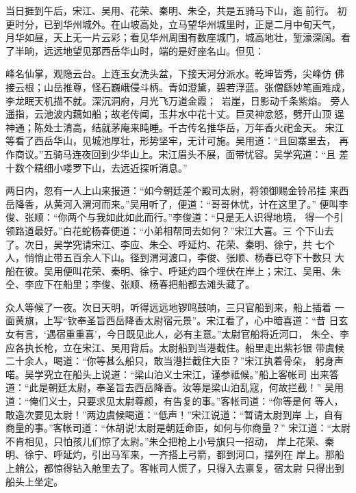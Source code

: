 当日捱到午后，宋江、吴用、花荣、秦明、朱仝，共是五骑马下山，迤前行。
初更时分，已到华州城外。在山坡高处，立马望华州城里时，正是二月中旬天气，
月华如昼，天上无一片云彩；看见华州周围有数座城门，城高地壮，堑濠深阔。看
了半晌，远远地望见那西岳华山时，端的是好座名山。但见：

峰名仙掌，观隐云台。上连玉女洗头盆，下接天河分派水。乾坤皆秀，尖峰仿
佛接云根；山岳推尊，怪石巍峨侵斗柄。青如澄黛，碧若浮蓝。张僧繇妙笔画难成，
李龙眠天机描不就。深沉洞府，月光飞万道金霞；岩崖，日影动千条紫焰。
旁人遥指，云池波内藕如船；故老传闻，玉井水中花十丈。巨灵神忿怒，劈开山顶
逞神通；陈处士清高，结就茅庵来盹睡。千古传名推华岳，万年香火祀金天。
宋江等看了西岳华山，见城池厚壮，形势坚牢，无计可施。吴用道：“且回寨里去，
再作商议。”五骑马连夜回到少华山上。宋江眉头不展，面带忧容。吴学究道：“且
差十数个精细小喽罗下山，去远近探听消息。”

两日内，忽有一人上山来报道：“如今朝廷差个殿司太尉，将领御赐金铃吊挂
来西岳降香，从黄河入渭河而来。”吴用听了，便道：“哥哥休忧，计在这里了。”
便叫李俊、张顺：“你两个与我如此如此而行。”李俊道：“只是无人识得地境，
得一个引领路道最好。”白花蛇杨春便道：“小弟相帮同去如何？”宋江大喜。三
个下山去了。次日，吴学究请宋江、李应、朱仝、呼延灼、花荣、秦明、徐宁，共
七个人，悄悄止带五百余人下山。径到渭河渡口，李俊、张顺、杨春已夺下十数只
大船在彼。吴用便叫花荣、秦明、徐宁、呼延灼四个埋伏在岸上；宋江、吴用、朱
仝、李应下在船里；李俊、张顺、杨春把船都去滩头藏了。

众人等候了一夜。次日天明，听得远远地锣鸣鼓响，三只官船到来，船上插着
一面黄旗，上写“钦奉圣旨西岳降香太尉宿元景”。宋江看了，心中暗喜道：“昔
日玄女有言，‘遇宿重重喜’，今日既见此人，必有主意。”太尉官船将近河口，
朱仝、李应各执长枪，立在宋江、吴用背后。太尉船到当港截住。船里走出紫衫银
带虞候二十余人，喝道：“你等甚么船只，敢当港拦截住大臣？”宋江执着骨朵，
躬身声喏。吴学究立在船头上说道：“梁山泊义士宋江，谨参祗候。”船上客帐司
出来答道：“此是朝廷太尉，奉圣旨去西岳降香。汝等是梁山泊乱寇，何故拦截！”
吴用道：“俺们义士，只要求见太尉尊颜，有告复的事。”客帐司道：“你等是何
等人，敢造次要见太尉！”两边虞候喝道：“低声！”宋江说道：“暂请太尉到岸
上，自有商量的事。”客帐司道：“休胡说!太尉是朝廷命臣，如何与你商量？”
宋江道：“太尉不肯相见，只怕孩儿们惊了太尉。”朱仝把枪上小号旗只一招动，
岸上花荣、秦明、徐宁、呼延灼，引出马军来，一齐搭上弓箭，都到河口，摆列在
岸上。那船上艄公，都惊得钻入舱里去了。客帐司人慌了，只得入去禀复，宿太尉
只得出到船头上坐定。

